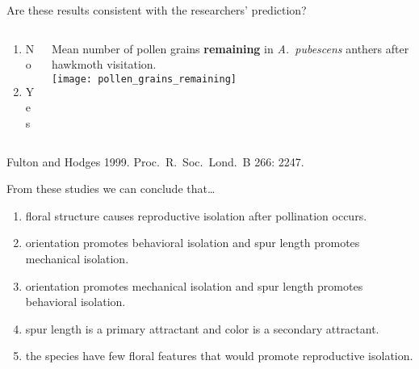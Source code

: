 \documentclass[t,hidelinks]{beamer}
\newcommand{\ques}[1]{\highlight{\textsc{q#1:}}}
\begin{document}
%
\begin{frame}[t]{\ques{13} Are these results consistent with the researchers' prediction?}
		\begin{columns}[t]
		\begin{column}{0.28\textwidth}
			\begin{enumerate}
				\item No
				\item \alert<2>{Yes}
			\end{enumerate}
		\end{column}
		\begin{column}{0.5\textwidth}
			Mean number of pollen grains \textbf{remaining} in \textit{A.~pubescens} anthers after hawkmoth visitation.\\[1ex]
			\texttt{[image: pollen\_grains\_remaining]}
		\end{column}
	\end{columns}
	
	\vfilll
	
	\tiny Fulton and Hodges 1999. Proc.~R.~Soc.~Lond.~B 266: 2247.
\end{frame}
%
\begin{frame}[t]{\ques{14} From these studies we can conclude that\dots}
	
	\begin{enumerate}
		\item floral structure causes reproductive isolation after pollination occurs.
		
		\item \alert<2>{orientation promotes behavioral isolation and spur length promotes mechanical isolation.}

		\item orientation promotes mechanical isolation and spur length promotes behavioral isolation.
		
		\item spur length is a primary attractant and color is a secondary attractant.

		\item the species have few floral features that would promote reproductive isolation.
		
	\end{enumerate}

\end{frame}
%
\end{document}
